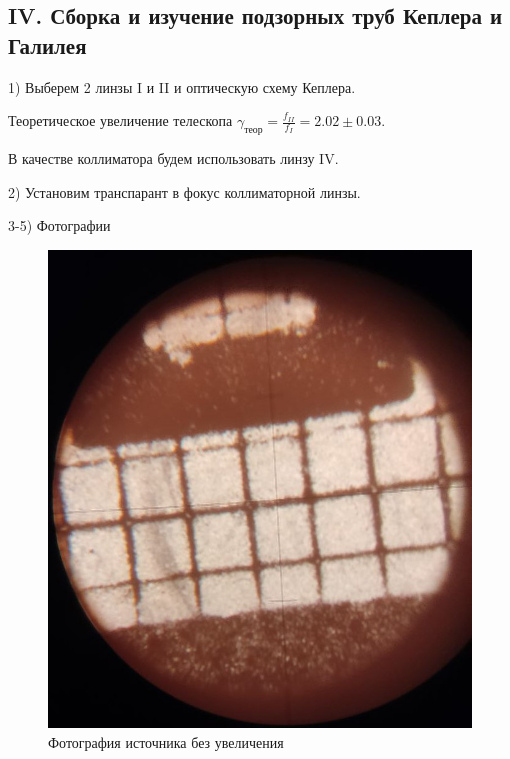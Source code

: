 \documentclass{astroedu-lab}
\begin{document}
\begin{problem}
\subsection{IV. Сборка и изучение подзорных труб Кеплера и Галилея}

1) Выберем 2 линзы I и II и оптическую схему Кеплера.

Теоретическое увеличение телескопа $\gamma_{\text{теор}} = \frac{f_{II}}{f_I} = 2.02 \pm 0.03$.

В качестве коллиматора будем использовать линзу IV.

2) Установим транспарант в фокус коллиматорной линзы.

3-5) Фотографии

\begin{figure}[H]
    \centering
    \includegraphics[scale=0.35]{7.jpg}
    \caption{Фотография источника без увеличения}
\end{figure}


\end{problem}
\end{document}
